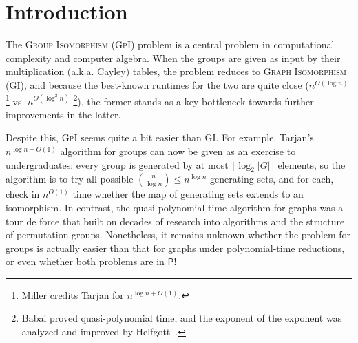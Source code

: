 \documentclass{theoretics}
\newcommand{\algprobm}[1]{\textsc{#1}\xspace}
\newcommand{\betacc}[1]{\ifthenelse{\equal{#1}{1}}{\exists^{\log n}}{\exists^{\log^{#1}n}}} %
\newcommand*{\ComplexityClass}[1]{\ensuremath{\mathsf{#1}}\xspace}
\newcommand*{\NP}{\ComplexityClass{NP}}
\renewcommand{\P}{\ComplexityClass{P}}
\newcommand*{\LogSpace}{\ComplexityClass{L}}
\newcommand{\ACz}{\ComplexityClass{AC^0}}
\newcommand{\qACz}{\ComplexityClass{quasiAC^0}}
\newcommand{\FOLL}{\ComplexityClass{FOLL}}
\begin{document}
\begin{abstract}
\begin{itemize}
\item \algprobm{Quasigroup Isomorphism} belongs to $\betacc{2}\ACz(\mathsf{TIMESPACE}(\text{polylog}(n), \log(n))) \subseteq \qACz$. As a consequence of this result and previously known $\ACz$ reductions, this implies the same upper bound for the \algprobm{Isomorphism Problems} for: Steiner triple systems, pseudo-STS graphs, \algprobm{Latin Square Isotopy}, Latin square graphs, and Steiner $(t,t+1)$-designs. 
This improves upon the previous upper bound for these problems, which was $\betacc{2}\LogSpace \cap \betacc{2}\FOLL \subseteq \mathsf{quasiFOLL}$ (Chattopadhyay, Tor\'an, \& Wagner, \emph{ibid.}; Levet, \textit{Australas. J. Combin.} 2023).

\item  As a strong contrast, we show that MGS for arbitrary magmas is \NP-complete.
\end{itemize}

Our results suggest that understanding the constant-depth circuit complexity may be key to resolving the complexity of problems concerning (quasi)groups in the multiplication table model.
\end{abstract}



\setcounter{page}{1}

\section{Introduction}
The \algprobm{Group Isomorphism} (\algprobm{GpI}) problem is a central problem in computational complexity and computer algebra. When the groups are given as input by their multiplication (a.k.a. Cayley) tables, the problem reduces to \algprobm{Graph Isomorphism} (\algprobm{GI}), and because the best-known runtimes for the two are quite close ($n^{O(\log n)}$ \cite{MillerTarjan}\footnote{Miller \cite{MillerTarjan} credits Tarjan for $n^{\log n + O(1)}$.} vs. $n^{O(\log^2 n)}$ \cite{BabaiGraphIso}\footnote{Babai \cite{BabaiGraphIso} proved quasi-polynomial time, and the exponent of the exponent was analyzed and improved by Helfgott~\cite{HelgottGIAnalysis}.}), the former stands as a key bottleneck towards further improvements in the latter. 

Despite this, \algprobm{GpI} seems quite a bit easier than \algprobm{GI}. For example, Tarjan's $n^{\log n + O(1)}$ algorithm for groups \cite{MillerTarjan} can now be given as an exercise to undergraduates: every group is generated by at most $\lfloor \log_2 |G| \rfloor$ elements, so the algorithm is to try all possible $\binom{n}{\log n} \leq n^{\log n}$ generating sets, and for each, check in $n^{O(1)}$ time whether the map of generating sets extends to an isomorphism. In contrast, the quasi-polynomial time algorithm for graphs was a tour de force that built on decades of research into algorithms and the structure of permutation groups. Nonetheless, it remains unknown whether the problem for groups is actually easier than that for graphs under polynomial-time reductions, or even whether both problems are in $\P$!
\end{document}
